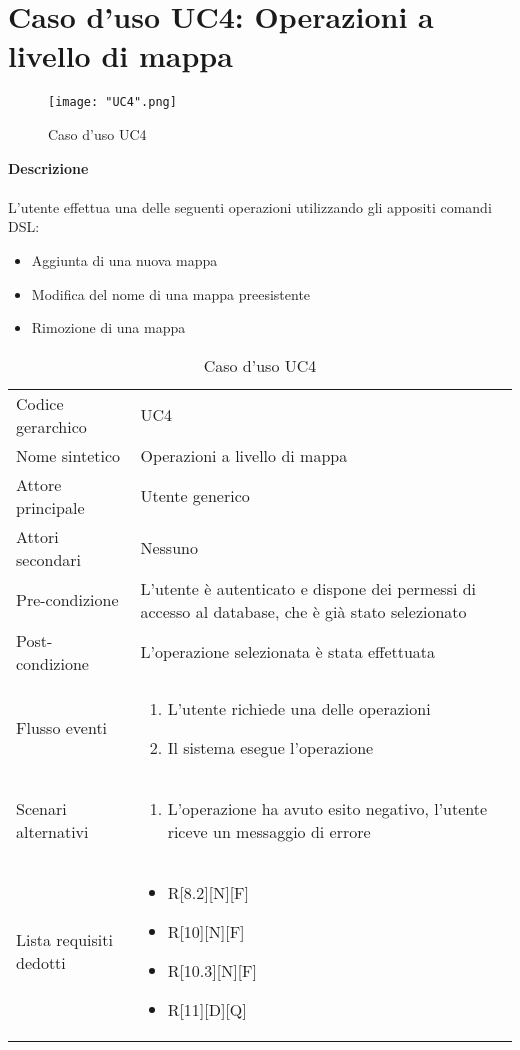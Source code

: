 \documentclass[a4paper]{report}
\begin{document}
	 \section{Caso d'uso UC4: Operazioni a livello di mappa}
	 \begin{figure}[H]
			\centering
			\texttt{[image: "UC4".png]}
			\caption{Caso d'uso UC4}
		\end{figure}
	 \textbf{Descrizione} \\ \\
	 L'utente effettua una delle seguenti operazioni utilizzando gli appositi comandi DSL:
	 \begin{itemize}
	 	\item Aggiunta di una nuova mappa
	 	\item Modifica del nome di una mappa preesistente
	 	\item Rimozione di una mappa
	 \end{itemize}
		\begin{table}[H]
		\begin{tabularx}{\textwidth}{X | X}\toprule
			\rowcolor{orange!65}Codice gerarchico & UC4 \\
			Nome sintetico &  Operazioni a livello di mappa \\
			\rowcolor{orange!65}Attore principale & Utente generico\\
			Attori secondari & Nessuno \\
			\rowcolor{orange!65}Pre-condizione & L'utente è autenticato e dispone dei permessi di accesso
			al database, che è già stato selezionato\\
			Post-condizione & L'operazione selezionata è stata effettuata\\
			\rowcolor{orange!65}Flusso eventi & \begin{enumerate}
			\item L'utente richiede una delle operazioni
			\item Il sistema esegue l'operazione
			\end{enumerate} \\
			Scenari alternativi & \begin{enumerate}
			\item L'operazione ha avuto esito negativo, l'utente riceve un messaggio di errore
			\end{enumerate} \\
			\rowcolor{orange!65}Lista requisiti dedotti & \begin{itemize}
				\item R[8.2][N][F]
				\item R[10][N][F]
				\item R[10.3][N][F]
				\item R[11][D][Q]
				\end{itemize} \\
			\bottomrule
		\end{tabularx}
		\caption{Caso d'uso UC4}
	 \end{table}
\end{document}
